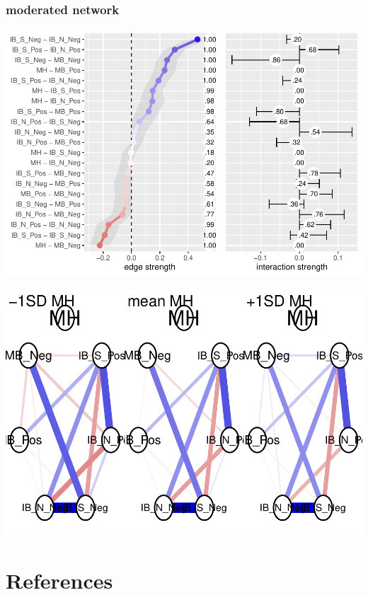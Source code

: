 \documentclass[man,floatsintext]{apa6}
\begin{document}
\hypertarget{moderated-network}{%
\subsubsection{moderated network}\label{moderated-network}}

\includegraphics{script_files/figure-latex/plotting the moderated network interactions-1.pdf}

\includegraphics{script_files/figure-latex/conditioning the visualisations on mental health-1.pdf}

\newpage

\hypertarget{references}{%
\section{References}\label{references}}

\begingroup
\setlength{\parindent}{-0.5in}
\setlength{\leftskip}{0.5in}

\hypertarget{refs}{}

\endgroup
\end{document}
